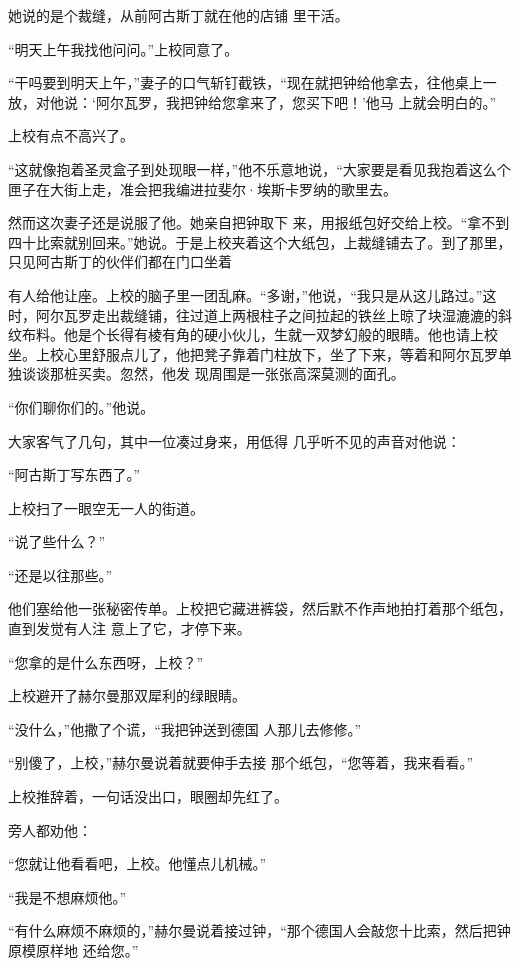 \documentclass{article}
\begin{document}
她说的是个裁缝，从前阿古斯丁就在他的店铺
里干活。 


“明天上午我找他问问。”上校同意了。 

“干吗要到明天上午，”妻子的口气斩钉截铁，“现在就把钟给他拿去，往他桌上一放，对他说：‘阿尔瓦罗，我把钟给您拿来了，您买下吧！’他马
上就会明白的。” 


上校有点不高兴了。 

“这就像抱着圣灵盒子到处现眼一样，”他不乐意地说，“大家要是看见我抱着这么个匣子在大街上走，准会把我编进拉斐尔·埃斯卡罗纳的歌里去。

然而这次妻子还是说服了他。她亲自把钟取下
\newpage
来，用报纸包好交给上校。“拿不到四十比索就别回来。”她说。于是上校夹着这个大纸包，上裁缝铺去了。到了那里，只见阿古斯丁的伙伴们都在门口坐着

有人给他让座。上校的脑子里一团乱麻。“多谢，”他说，“我只是从这儿路过。”这时，阿尔瓦罗走出裁缝铺，往过道上两根柱子之间拉起的铁丝上晾了块湿漉漉的斜纹布料。他是个长得有棱有角的硬小伙儿，生就一双梦幻般的眼睛。他也请上校坐。上校心里舒服点儿了，他把凳子靠着门柱放下，坐了下来，等着和阿尔瓦罗单独谈谈那桩买卖。忽然，他发
现周围是一张张高深莫测的面孔。 


“你们聊你们的。”他说。 

大家客气了几句，其中一位凑过身来，用低得
几乎听不见的声音对他说： 


“阿古斯丁写东西了。” 


\newpage

上校扫了一眼空无一人的街道。 


“说了些什么？” 


“还是以往那些。” 

他们塞给他一张秘密传单。上校把它藏进裤袋，然后默不作声地拍打着那个纸包，直到发觉有人注
意上了它，才停下来。 


“您拿的是什么东西呀，上校？” 


上校避开了赫尔曼那双犀利的绿眼睛。 

“没什么，”他撒了个谎，“我把钟送到德国
人那儿去修修。” 

“别傻了，上校，”赫尔曼说着就要伸手去接
那个纸包，“您等着，我来看看。” 

上校推辞着，一句话没出口，眼圈却先红了。

\newpage
旁人都劝他： 

“您就让他看看吧，上校。他懂点儿机械。”


“我是不想麻烦他。” 

“有什么麻烦不麻烦的，”赫尔曼说着接过钟，“那个德国人会敲您十比索，然后把钟原模原样地
还给您。” 
\end{document}

